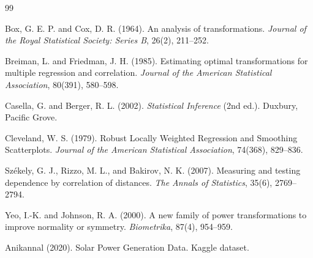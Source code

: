 \documentclass[a4paper,fleqn]{cas-sc}
\begin{document}
\begin{thebibliography}{99}
\small

\small



Box, G. E. P. and Cox, D. R. (1964). An analysis of transformations. \textit{Journal of the Royal Statistical Society: Series B}, 26(2), 211--252.

Breiman, L. and Friedman, J. H. (1985). Estimating optimal transformations for multiple regression and correlation. \textit{Journal of the American Statistical Association}, 80(391), 580--598.

Casella, G. and Berger, R. L. (2002). \textit{Statistical Inference} (2nd ed.). Duxbury, Pacific Grove.

Cleveland, W. S. (1979). Robust Locally Weighted Regression and Smoothing Scatterplots. \textit{Journal of the American Statistical Association}, 74(368), 829--836.


Székely, G. J., Rizzo, M. L., and Bakirov, N. K. (2007). Measuring and testing dependence by correlation of distances. \textit{The Annals of Statistics}, 35(6), 2769--2794.

Yeo, I.-K. and Johnson, R. A. (2000). A new family of power transformations to improve normality or symmetry. \textit{Biometrika}, 87(4), 954--959.


Anikannal (2020). Solar Power Generation Data. Kaggle dataset.



\end{thebibliography}
\end{document}
